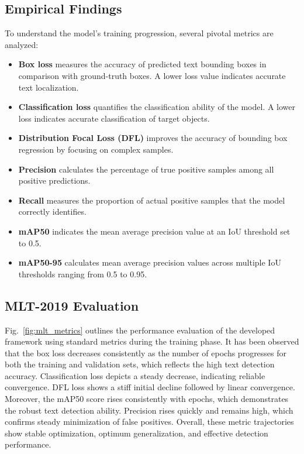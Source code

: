 \documentclass{ieeeaccess}
\begin{document}
\subsection{Empirical Findings}

To understand the model's training progression, several pivotal metrics are
analyzed:

\begin{itemize}
  \item \textbf{Box loss} measures the accuracy of predicted text bounding boxes in comparison with ground-truth boxes. A lower loss value indicates accurate text localization.
  \item \textbf{Classification loss} quantifies the classification ability of the model. A lower loss indicates accurate classification of target objects.
  \item \textbf{Distribution Focal Loss (DFL)} improves the accuracy of bounding box regression by focusing on complex samples.
  \item \textbf{Precision} calculates the percentage of true positive samples among all positive predictions.
  \item \textbf{Recall} measures the proportion of actual positive samples that the model correctly identifies.
  \item \textbf{mAP50} indicates the mean average precision value at an IoU threshold set to 0.5.
  \item \textbf{mAP50-95} calculates mean average precision values across multiple IoU thresholds ranging from 0.5 to 0.95.
\end{itemize}

\subsection{MLT-2019 Evaluation}

Fig.~\ref{fig:mlt_metrics} outlines the performance evaluation of the developed framework using standard metrics during the training phase. It has been observed that the box loss decreases consistently as the number of epochs progresses for both the training and validation sets, which reflects the high text detection accuracy. Classification loss depicts a steady decrease, indicating reliable convergence. DFL loss shows a stiff initial decline followed by linear convergence. Moreover, the mAP50 score rises consistently with epochs, which demonstrates the robust text detection ability. Precision rises quickly and remains high, which confirms steady minimization of false positives. Overall, these metric trajectories show stable optimization, optimum generalization, and effective detection performance.
\end{document}
